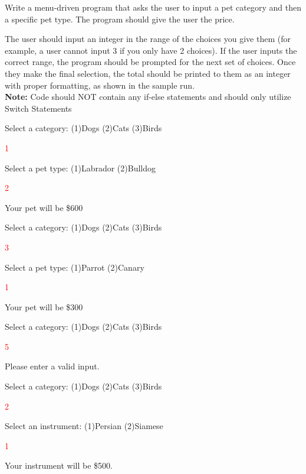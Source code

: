Write a menu-driven program that asks the user to input a pet category and then a specific pet type. The program should give the user the price.

The user should input an integer in the range of the choices you give them (for example, a user cannot input 3 if you only have 2 choices). If the user inputs the correct range, the program should be prompted for the next set of choices. Once they make the final selection, the total should be printed to them as an integer with proper formatting, as shown in the sample run. \\

\textbf{Note:} Code should NOT contain any  if-else statements and should only utilize Switch Statements


\begin{sample}
Select a category: (1)Dogs (2)Cats (3)Birds

 \textcolor{red}{1}
 
Select a pet type: (1)Labrador (2)Bulldog

 \textcolor{red}{2}
 
Your pet will be \$600

\end{sample}

\begin{sample}
Select a category: (1)Dogs (2)Cats (3)Birds

 \textcolor{red}{3}
 
Select a pet type: (1)Parrot (2)Canary

 \textcolor{red}{1}
 
Your pet will be \$300

\end{sample}

\begin{sample}
Select a category: (1)Dogs (2)Cats (3)Birds

 \textcolor{red}{5}
 
Please enter a valid input.

\end{sample}
\begin{sample}
Select a category: (1)Dogs (2)Cats (3)Birds

 \textcolor{red}{2}
 
 
Select an instrument: (1)Persian (2)Siamese

 \textcolor{red}{1}
 
Your instrument will be \$500.


\end{sample}

